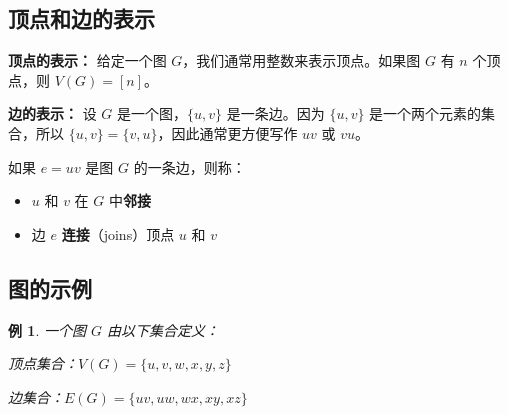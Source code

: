 \documentclass[12pt, a4paper]{article}
\newtheorem{example}{例}[section]
\begin{document}
\subsection{顶点和边的表示}

\textbf{顶点的表示：} 给定一个图 $G$，我们通常用整数来表示顶点。如果图 $G$ 有 $n$ 个顶点，则 $V(G) = [n]$。

\textbf{边的表示：} 设 $G$ 是一个图，$\{u, v\}$ 是一条边。因为 $\{u, v\}$ 是一个两个元素的集合，所以 $\{u, v\} = \{v, u\}$，因此通常更方便写作 $uv$ 或 $vu$。

如果 $e = uv$ 是图 $G$ 的一条边，则称：
\begin{itemize}
    \item $u$ 和 $v$ 在 $G$ 中\textbf{邻接}
    \item 边 $e$ \textbf{连接}（joins）顶点 $u$ 和 $v$
\end{itemize}

\subsection{图的示例}

\begin{example}
一个图 $G$ 由以下集合定义：

顶点集合：$V(G) = \{u, v, w, x, y, z\}$

边集合：$E(G) = \{uv, uw, wx, xy, xz\}$

\begin{center}
\end{center}
\end{example}
\end{document}
